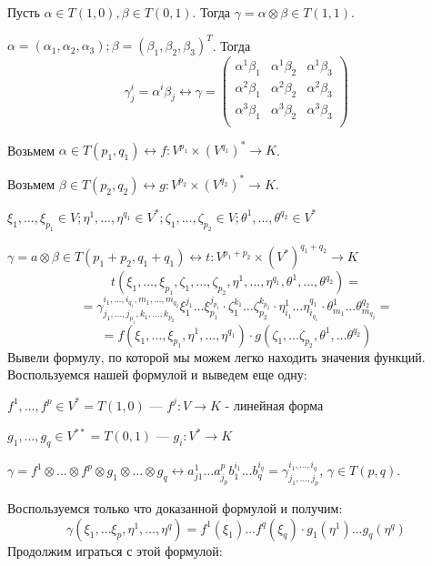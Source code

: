 Пусть $\alpha \in T(1,0), \beta \in T(0,1)$. Тогда $\gamma = \alpha \otimes \beta  \in T(1,1)$.

$\alpha = (\alpha_1,\alpha_2,\alpha_3); \beta =(\beta_1,\beta_2,\beta_3)^T$. Тогда
$$\gamma^i_j =\alpha^i\beta_j \leftrightarrow \gamma = \begin{pmatrix}
    \alpha^1\beta_1 &\alpha^1\beta_2 & \alpha^1 \beta_3 \\
    \alpha^2\beta_1 &\alpha^2\beta_2 & \alpha^2 \beta_3 \\
     \alpha^3\beta_1 &\alpha^3\beta_2 & \alpha^3 \beta_3 \\
\end{pmatrix}$$



Возьмем $\alpha \in T(p_1,q_1) \leftrightarrow f: V^{p_1}\times(V^{q_1})^* \rightarrow K$. 

Возьмем $\beta \in T(p_2,q_2) \leftrightarrow g: V^{p_2}\times(V^{q_2})^* \rightarrow K$.

$\xi_1,\ldots, \xi_{p_1} \in V;\eta^1,\ldots, \eta^{q_1}\in V^*;\zeta_1,\ldots, \zeta_{p_2}\in V; \theta^1,\ldots, \theta^{q_2}\in V^*$

$\gamma = a \otimes \beta \in T(p_1+p_2, q_1+q_1)\leftrightarrow t: V^{p_1+p_2}\times (V^*)^{q_1+q_2}\rightarrow K$
$$t(\xi_1,\ldots,\xi_{p_1},\zeta_1,\ldots,\zeta_{p_2}, \eta^1,\ldots, \eta^{q_1},\theta^1,\ldots, \theta^{q_2}) =$$$$= \gamma_{j_1,\ldots,j_{p_1},k_1,\ldots,k_{p_2}}^{i_1,\ldots,i_{q_1},m_1,\ldots,m_{q_2}} \xi_1^{j_1}\ldots \xi_{p_1}^{j_{p_1}}\cdot \zeta_1^{k_1}\ldots \zeta_{p_2}^{k_{p_2}} \cdot \eta^1_{i_1}\ldots \eta_{i_{q_1}}^{q_1} \cdot \theta_{m_1}^1 \ldots \theta^{q_2}_{m_{q_2}} = $$
$$=f(\xi_1,\ldots, \xi_{p_1},\eta^1,\ldots, \eta^{q_1})\cdot g(\zeta_1,\ldots \zeta_{p_2}, \theta^1,\ldots \theta^{q_2}) $$
Вывели формулу, по которой мы можем легко находить значения функций. Воспользуемся нашей формулой и выведем еще одну:

$f^1,\ldots , f^p \in V^* = T(1,0)$ --- $f^j:V\rightarrow K$  - линейная форма

$g_1,\ldots,g_q\in V^{**} = T(0,1)$ --- $g_i:V^*\rightarrow K$

$\gamma = f^1\otimes \ldots \otimes f^p \otimes g_1 \otimes \ldots \otimes g_q \leftrightarrow a^1_{j1}\ldots a^{p}_{j_p}b_1^{i_1}\ldots b_q^{i_q}= \gamma^{i_1,\ldots, i_q}_{j_1,\ldots, j_p}$, $\gamma \in T(p,q)$.

Воспользуемся только что доказанной формулой и получим:
$$\gamma(\xi_1,\ldots \xi_p, \eta^1,\ldots, \eta^q)= f^1(\xi_1)\ldots f^q(\xi_q)\cdot g_1(\eta^1)\ldots g_q(\eta^q)$$
Продолжим играться с этой формулой:

